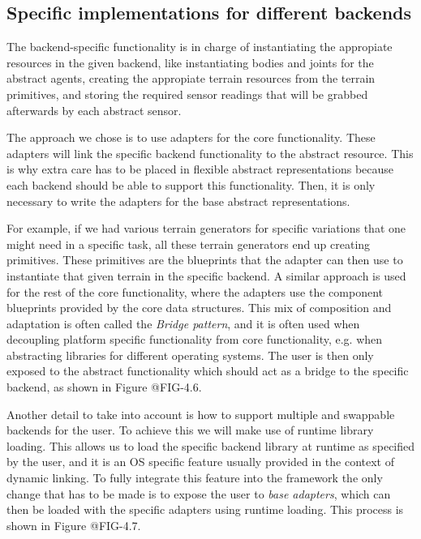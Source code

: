 \figFrameworkCoreAgent

\figFrameworkCoreAgent

\figFrameworkCoreAgent

\subsection{Specific implementations for different backends}


The backend-specific functionality is in charge of instantiating the appropiate 
resources in the given backend, like instantiating bodies and joints for the abstract 
agents, creating the appropiate terrain resources from the terrain primitives, and storing
the required sensor readings that will be grabbed afterwards by each abstract sensor.

The approach we chose is to use adapters for the core functionality. These adapters
will link the specific backend functionality to the abstract resource. This is why
extra care has to be placed in flexible abstract representations because each backend
should be able to support this functionality. Then, it is only necessary to write
the adapters for the base abstract representations.

For example, if we had various terrain generators for specific variations that one
might need in a specific task, all these terrain generators end up creating primitives.
These primitives are the blueprints that the adapter can then use to instantiate that given
terrain in the specific backend. A similar approach is used for the rest of the core
functionality, where the adapters use the component blueprints provided by the core data structures.
This mix of composition and adaptation is often called the \textit{Bridge pattern}, and it is
often used when decoupling platform specific functionality from core functionality, e.g. when
abstracting libraries for different operating systems. The user is then only exposed to
the abstract functionality which should act as a bridge to the specific backend, as shown in
Figure @FIG-4.6.



Another detail to take into account is how to support multiple and swappable backends
for the user. To achieve this we will make use of runtime library loading. This allows us
to load the specific backend library at runtime as specified by the user, and it is an OS specific
feature usually provided in the context of dynamic linking. To fully integrate
this feature into the framework the only change that has to be made is to expose the user 
to \textit{base adapters}, which can then be loaded with the specific adapters using runtime loading.
This process is shown in Figure @FIG-4.7.

